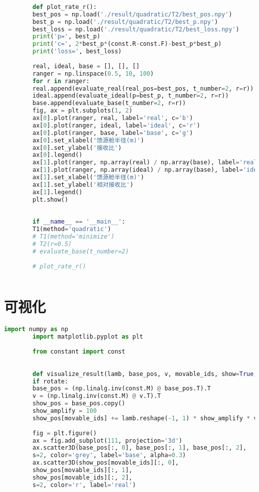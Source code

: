 \documentclass[withoutpreface,bwprint,fontset=macnew]{cumcmthesis} %
\begin{document}
\begin{appendices}
\begin{lstlisting}[language=python]
		
		def plot_rate_r():
		best_pos = np.load('./result/quadratic/T2/best_pos.npy')
		best_p = np.load('./result/quadratic/T2/best_p.npy')
		best_loss = np.load('./result/quadratic/T2/best_loss.npy')
		print('p=', best_p)
		print('c=', 2*best_p*(const.R-const.F)-best_p*best_p)
		print('loss=', best_loss)
		
		real, ideal, base = [], [], []
		ranger = np.linspace(0.5, 10, 100)
		for r in ranger:
		real.append(evaluate_real(real_pos=best_pos, t_number=2, r=r))
		ideal.append(evaluate_ideal(p=best_p, t_number=2, r=r))
		base.append(evaluate_base(t_number=2, r=r))
		fig, ax = plt.subplots(1, 2)
		ax[0].plot(ranger, real, label='real', c='b')
		ax[0].plot(ranger, ideal, label='ideal', c='r')
		ax[0].plot(ranger, base, label='base', c='g')
		ax[0].set_xlabel('馈源舱半径(m)')
		ax[0].set_ylabel('接收比')
		ax[0].legend()
		ax[1].plot(ranger, np.array(real) / np.array(base), label='real/base', c='b')
		ax[1].plot(ranger, np.array(ideal) / np.array(base), label='ideal/base', c='r')
		ax[1].set_xlabel('馈源舱半径(m)')
		ax[1].set_ylabel('相对接收比')
		ax[1].legend()
		plt.show()
		
		
		if __name__ == '__main__':
		T1(method='quadratic')
		# T1(method='minimize')
		# T2(r=0.5)
		# evaluate_base(t_number=2)
		
		# plot_rate_r()
		
	\end{lstlisting}
	
	
	\section{可视化}
	
	\begin{lstlisting}[language=python]
		import numpy as np
		import matplotlib.pyplot as plt
		
		from constant import const
		
		
		def visualize_result(lamb, base_pos, v, movable_ids, show=True, save=True, rotate=False):
		if rotate:
		base_pos = (np.linalg.inv(const.M) @ base_pos.T).T
		v = (np.linalg.inv(const.M) @ v.T).T
		show_pos = base_pos.copy()
		show_amplify = 100
		show_pos[movable_ids] += lamb.reshape(-1, 1) * show_amplify * v[movable_ids]
		
		fig = plt.figure()
		ax = fig.add_subplot(111, projection='3d')
		ax.scatter3D(base_pos[:, 0], base_pos[:, 1], base_pos[:, 2],
		s=2, color='grey', label='base', alpha=0.3)
		ax.scatter3D(show_pos[movable_ids][:, 0],
		show_pos[movable_ids][:, 1],
		show_pos[movable_ids][:, 2],
		s=2, color='r', label='real')
		

\end{lstlisting}
\end{appendices}
\end{document}
